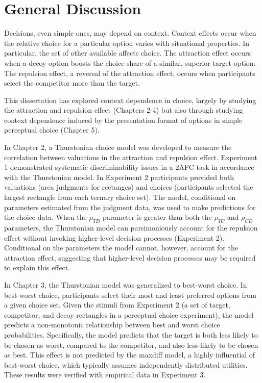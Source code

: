 \section{General Discussion}

Decisions, even simple ones, may depend on context. Context effects occur when the relative choice for a particular option varies with situational properties. In particular, the set of other available affects choice. The attraction effect occurs when a decoy option boosts the choice share of a similar, superior target option. The repulsion effect, a reversal of the attraction effect, occurs when participants select the competitor more than the target. 

This dissertation has explored context dependence in choice, largely by studying the attraction and repulsion effect (Chapters 2-4) but also through studying context dependence induced by the presentation format of options in simple perceptual choice (Chapter 5).

In Chapter 2, a Thurstonian choice model was developed to measure the correlation between valuations in the attraction and repulsion effect. Experiment 1 demonstrated systematic discriminability issues in a 2AFC task in accordance with the Thurstonian model. In Experiment 2 participants provided both valuations (area judgments for rectanges) and choices (participants selected the largest rectangle from each ternary choice set). The model, conditional on parameters estimated from the judgment data, was used to make predictions for the choice data. When the $\rho_{TD}$ parameter is greater than both the $\rho_{TC}$ and $\rho_{CD}$ parameters, the Thurstonian model can parsimoniously account for the repulsion effect without invoking higher-level decision processes (Experiment 2). Conditional on the parameters the model cannot, however, account for the attraction effect, suggesting that higher-level decision processes may be required to explain this effect. 

In Chapter 3, the Thurstonian model was generalized to best-worst choice. In best-worst choice, participants select their most and least preferred options from a given choice set. Given the stimuli from Experiment 2 (a set of target, competitor, and decoy rectangles in a perceptual choice experiment), the model predicts a non-monotonic relationship between best and worst choice probabilities. Specifically, the model predicts that the target is both less likely to be chosen as worst, compared to the competitor, and also less likely to be chosen as best. This effect is not predicted by the maxdiff model, a highly influential of best-worst choice, which typically assumes independently distributed utilities. These results were verified with empirical data in Experiment 3.

